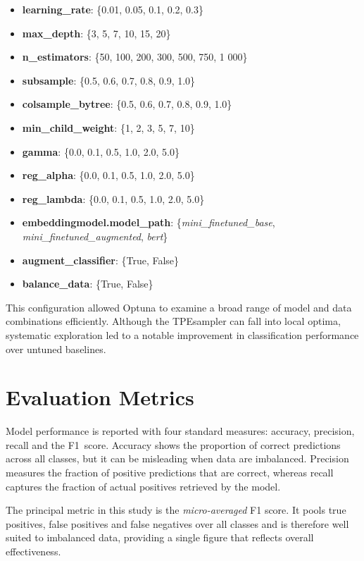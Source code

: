 \documentclass{SGGW-thesis-EN}
\begin{document}
\begin{itemize}
  \item \textbf{learning\_rate}: \{0.01, 0.05, 0.1, 0.2, 0.3\}
  \item \textbf{max\_depth}: \{3, 5, 7, 10, 15, 20\}
  \item \textbf{n\_estimators}: \{50, 100, 200, 300, 500, 750, 1 000\}
  \item \textbf{subsample}: \{0.5, 0.6, 0.7, 0.8, 0.9, 1.0\}
  \item \textbf{colsample\_bytree}: \{0.5, 0.6, 0.7, 0.8, 0.9, 1.0\}
  \item \textbf{min\_child\_weight}: \{1, 2, 3, 5, 7, 10\}
  \item \textbf{gamma}: \{0.0, 0.1, 0.5, 1.0, 2.0, 5.0\}
  \item \textbf{reg\_alpha}: \{0.0, 0.1, 0.5, 1.0, 2.0, 5.0\}
  \item \textbf{reg\_lambda}: \{0.0, 0.1, 0.5, 1.0, 2.0, 5.0\}
  \item \textbf{embeddingmodel.model\_path}:\newline
  \{\textit{mini\_finetuned\_base}, \textit{mini\_finetuned\_augmented}, \textit{bert}\}
  \item \textbf{augment\_classifier}: \{True, False\}
  \item \textbf{balance\_data}: \{True, False\}
\end{itemize}

This configuration allowed Optuna to examine a broad range of model and data combinations efficiently. Although the
TPEsampler can fall into local optima, systematic exploration led to a notable improvement in classification
performance over untuned baselines.


\section{Evaluation Metrics}
Model performance is reported with four standard measures: accuracy, precision, recall and the
F1\, score. Accuracy shows the proportion of correct predictions across all classes, but it can be
misleading when data are imbalanced. Precision measures the fraction of positive predictions that are correct, whereas
recall captures the fraction of actual positives retrieved by the model.

The principal metric in this study is the \emph{micro-averaged} F1 score. It pools true positives,
false positives and false negatives over all classes and is therefore well suited to imbalanced data, providing a
single figure that reflects overall effectiveness.
\end{document}
